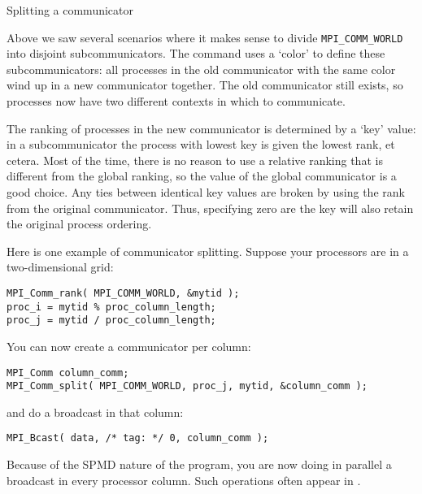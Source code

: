 
 {Splitting a communicator}
\label{sec:comm-split}

Above we saw several scenarios where it makes sense to divide
\lstinline{MPI_COMM_WORLD} into disjoint subcommunicators.
The command  uses a `color' to define
these subcommunicators:
all processes in the old communicator with the same color
wind up in a new communicator together. The old communicator still exists,
so processes now have two different contexts in which to communicate.

The ranking of processes in the new communicator is determined by a `key' value:
in a subcommunicator the process with lowest key is given the lowest rank, et cetera.
Most of the time, there is no reason to use a relative ranking that is different from
the global ranking, so the  value of the global communicator
is a good choice.
Any ties between identical key values are broken by using the rank from the original
communicator.
Thus, specifying zero are the key will also retain the original process ordering.

Here is one example of communicator splitting. Suppose your processors
are in a two-dimensional grid:
\begin{lstlisting}
MPI_Comm_rank( MPI_COMM_WORLD, &mytid );
proc_i = mytid % proc_column_length;
proc_j = mytid / proc_column_length;
\end{lstlisting}
You can now create a communicator per column:
\begin{lstlisting}
MPI_Comm column_comm;
MPI_Comm_split( MPI_COMM_WORLD, proc_j, mytid, &column_comm );
\end{lstlisting}
and do a broadcast in that column:
\begin{lstlisting}
MPI_Bcast( data, /* tag: */ 0, column_comm );
\end{lstlisting}
Because of the SPMD nature of the program, you are now doing in parallel
a broadcast in every processor column. Such operations often appear
in .

